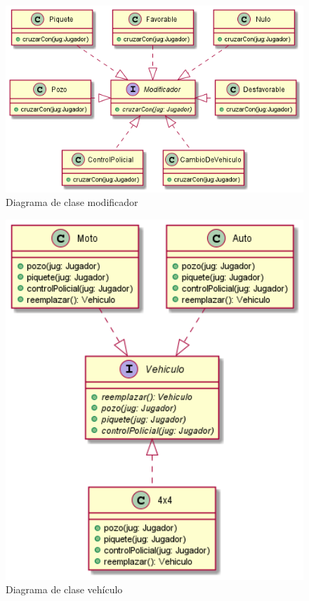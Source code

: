 \documentclass[titlepage,a4paper]{article}
\begin{document}
\begin{figure}[H]
  \centering
  \includegraphics[width=1\textwidth]{diagramas/ClaseModificador.png}
  \caption{\label{fig:seq03} Diagrama de clase modificador}
\end{figure}

\begin{figure}[H]
  \centering
  \includegraphics[width=1\textwidth]{diagramas/ClaseVehiculo.png}
  \caption{\label{fig:seq04} Diagrama de clase vehículo}
\end{figure}
\end{document}
